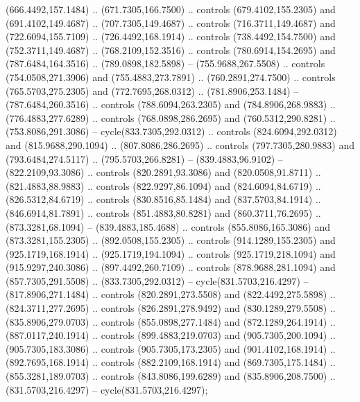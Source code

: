 {{\begin{scope}[x=0.80pt,y=-0.80pt,scale=0.038,xshift=-450pt,yshift=360pt]
        (666.4492,157.1484) .. (671.7305,166.7500) .. controls (679.4102,155.2305) and
        (691.4102,149.4687) .. (707.7305,149.4687) .. controls (716.3711,149.4687) and
        (722.6094,155.7109) .. (726.4492,168.1914) .. controls (738.4492,154.7500) and
        (752.3711,149.4687) .. (768.2109,152.3516) .. controls (780.6914,154.2695) and
        (787.6484,164.3516) .. (789.0898,182.5898) -- (755.9688,267.5508) .. controls
        (754.0508,271.3906) and (755.4883,273.7891) .. (760.2891,274.7500) .. controls
        (765.5703,275.2305) and (772.7695,268.0312) .. (781.8906,253.1484) --
        (787.6484,260.3516) .. controls (788.6094,263.2305) and (784.8906,268.9883) ..
        (776.4883,277.6289) .. controls (768.0898,286.2695) and (760.5312,290.8281) ..
        (753.8086,291.3086) -- cycle(833.7305,292.0312) .. controls
        (824.6094,292.0312) and (815.9688,290.1094) .. (807.8086,286.2695) .. controls
        (797.7305,280.9883) and (793.6484,274.5117) .. (795.5703,266.8281) --
        (839.4883,96.9102) -- (822.2109,93.3086) .. controls (820.2891,93.3086) and
        (820.0508,91.8711) .. (821.4883,88.9883) .. controls (822.9297,86.1094) and
        (824.6094,84.6719) .. (826.5312,84.6719) .. controls (830.8516,85.1484) and
        (837.5703,84.1914) .. (846.6914,81.7891) .. controls (851.4883,80.8281) and
        (860.3711,76.2695) .. (873.3281,68.1094) -- (839.4883,185.4688) .. controls
        (855.8086,165.3086) and (873.3281,155.2305) .. (892.0508,155.2305) .. controls
        (914.1289,155.2305) and (925.1719,168.1914) .. (925.1719,194.1094) .. controls
        (925.1719,218.1094) and (915.9297,240.3086) .. (897.4492,260.7109) .. controls
        (878.9688,281.1094) and (857.7305,291.5508) .. (833.7305,292.0312) --
        cycle(831.5703,216.4297) -- (817.8906,271.1484) .. controls
        (820.2891,273.5508) and (822.4492,275.5898) .. (824.3711,277.2695) .. controls
        (826.2891,278.9492) and (830.1289,279.5508) .. (835.8906,279.0703) .. controls
        (855.0898,277.1484) and (872.1289,264.1914) .. (887.0117,240.1914) .. controls
        (899.4883,219.0703) and (905.7305,200.1094) .. (905.7305,183.3086) .. controls
        (905.7305,173.2305) and (901.4102,168.1914) .. (892.7695,168.1914) .. controls
        (882.2109,168.1914) and (869.7305,175.1484) .. (855.3281,189.0703) .. controls
        (843.8086,199.6289) and (835.8906,208.7500) .. (831.5703,216.4297) --
        cycle(831.5703,216.4297);
    \end{scope}
  }
}